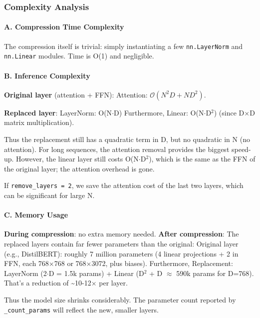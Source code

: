 \subsubsection*{Complexity Analysis}

\paragraph{A. Compression Time Complexity}

The compression itself is trivial: simply instantiating a few \texttt{nn.LayerNorm} and \texttt{nn.Linear} modules. Time is O(1) and negligible.

\paragraph{B. Inference Complexity}

\textbf{Original layer} (attention + FFN):
Attention: $\mathcal{O}(N^2 D + N D^2)$.


\textbf{Replaced layer}:
LayerNorm: O(N$\cdot$D) Furthermore, Linear: O(N$\cdot$D$^2$) (since D$\times$D matrix multiplication).

Thus the replacement still has a quadratic term in D, but no quadratic in N (no attention). For long sequences, the attention removal provides the biggest speed-up. However, the linear layer still costs O(N$\cdot$D$^2$), which is the same as the FFN of the original layer; the attention overhead is gone.

If \texttt{remove\_layers = 2}, we save the attention cost of the last two layers, which can be significant for large N.

\paragraph{C. Memory Usage}

\textbf{During compression}: no extra memory needed.
\textbf{After compression}: The replaced layers contain far fewer parameters than the original:
Original layer (e.g., DistilBERT): roughly 7 million parameters (4 linear projections + 2 in FFN, each 768$\times$768 or 768$\times$3072, plus biases). Furthermore, Replacement: LayerNorm (2$\cdot$D = 1.5k params) + Linear (D$^2$ + D $\approx$ 590k params for D=768). That's a reduction of \textasciitilde{}10-12$\times$ per layer.


Thus the model size shrinks considerably. The parameter count reported by \texttt{\_count\_params} will reflect the new, smaller layers.


